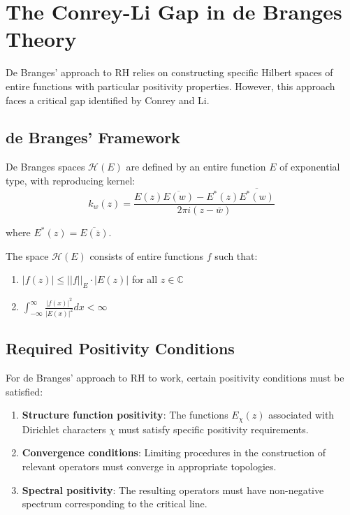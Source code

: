 \section{The Conrey-Li Gap in de Branges Theory}
\label{sec:conrey_li_gap}

De Branges' approach to RH relies on constructing specific Hilbert spaces of entire functions with particular positivity properties. However, this approach faces a critical gap identified by Conrey and Li.

\subsection{de Branges' Framework}

De Branges spaces $\mathcal{H}(E)$ are defined by an entire function $E$ of exponential type, with reproducing kernel:
$$k_w(z) = \frac{E(z)\overline{E(w)} - E^*(z)\overline{E^*(w)}}{2\pi i (z - \overline{w})}$$

where $E^*(z) = \overline{E(\overline{z})}$.

\begin{definition}
The space $\mathcal{H}(E)$ consists of entire functions $f$ such that:
\begin{enumerate}
\item $|f(z)| \leq ||f||_E \cdot |E(z)|$ for all $z \in \mathbb{C}$
\item $\int_{-\infty}^{\infty} \frac{|f(x)|^2}{|E(x)|^2} dx < \infty$
\end{enumerate}
\end{definition}

\subsection{Required Positivity Conditions}

For de Branges' approach to RH to work, certain positivity conditions must be satisfied:

\begin{enumerate}
\item \textbf{Structure function positivity}: The functions $E_\chi(z)$ associated with Dirichlet characters $\chi$ must satisfy specific positivity requirements.

\item \textbf{Convergence conditions}: Limiting procedures in the construction of relevant operators must converge in appropriate topologies.

\item \textbf{Spectral positivity}: The resulting operators must have non-negative spectrum corresponding to the critical line.
\end{enumerate}

